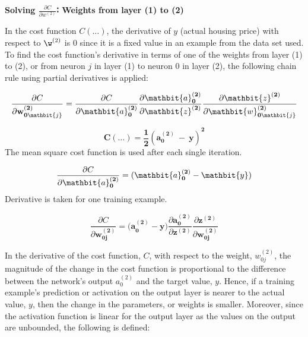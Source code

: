 \documentclass[12pt,a4paper]{article}
\begin{document}
\hspace{}

\textbf{Solving $\frac{\partial C}{\partial w^{\left(2\right)}}$∶ Weights from layer (1) to (2)}


In the cost function $C(…)$, the derivative of $y$ (actual housing price) with respect to $\w^{\left(2\right)}$ is 0 since it is a fixed value in an example from the data set used. To find the cost function’s derivative in terms of one of the weights from layer (1) to (2), or from neuron $j$ in layer (1) to neuron 0 in layer (2), the following chain rule using partial derivatives is applied:


\begin{equation}
\frac{\partial C}{\partial\mathbf{w}_{\mathbf{0}\mathbit{j}}^{\left(\mathbf{2}\right)}}=\frac{\partial C}{\partial\mathbit{a}_\mathbf{0}^{\left(\mathbf{2}\right)}}\frac{\partial\mathbit{a}_\mathbf{0}^{\left(\mathbf{2}\right)}}{\partial\mathbit{z}^{\left(\mathbf{2}\right)}}\frac{\partial\mathbit{z}^{\left(\mathbf{2}\right)}}{\partial\mathbit{w}_{\mathbf{0}\mathbit{j}}^{\left(\mathbf{2}\right)}}
\end{equation}	


\begin{equation}
\mathbf{C}\left(\ldots\right)= {\frac{\mathbf{1}}{\mathbf{2}}\left(\mathbf{a}_\mathbf{0}^{\left(\mathbf{2}\right)}\ -\ \mathbf{y}\right)}^\mathbf{2}
\end{equation}	
The mean square cost function is used after each single iteration.


\begin{equation}
\frac{\partial C}{\partial\mathbit{a}_\mathbf{0}^{\left(\mathbf{2}\right)}}={(\mathbit{a}}_\mathbf{0}^{\left(\mathbf{2}\right)}-\mathbit{y})
\end{equation}	
Derivative is taken for one training example.



\begin{equation}
\frac{\partial C}{\partial\mathbf{w}_{\mathbf{0j}}^{\left(\mathbf{2}\right)}}={(\mathbf{a}}_\mathbf{0}^{\left(\mathbf{2}\right)}-\mathbf{y})\frac{\partial\mathbf{a}_\mathbf{0}^{\left(\mathbf{2}\right)}}{\partial\mathbf{z}^{\left(\mathbf{2}\right)}}\frac{\partial\mathbf{z}^{\left(\mathbf{2}\right)}}{\partial\mathbf{w}_{\mathbf{0j}}^{\left(\mathbf{2}\right)}}	
\end{equation}	

In the derivative of the cost function, $C$, with respect to the weight, $w_{0j}^{\left(2\right)}$, the magnitude of the change in the cost function is proportional to the difference between the network’s output $a_0^{\left(2\right)}$ and the target value, $y$. Hence, if a training example’s prediction or activation on the output layer is nearer to the actual value, $y$, then the change in the parameters, or weights is smaller. Moreover, since the activation function is linear for the output layer as the values on the output are unbounded, the following is defined:
\end{document}
